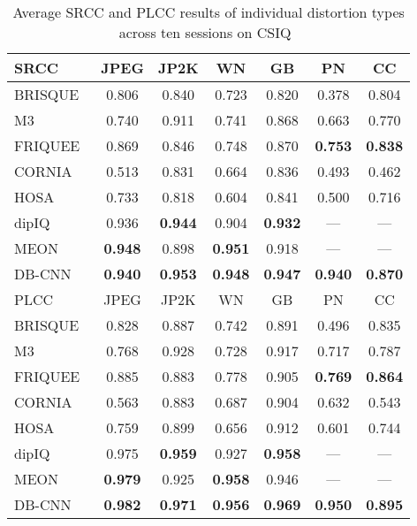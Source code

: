 \documentclass[journal]{IEEEtran}
\begin{document}
\begin{table}[t]
  \centering
  \caption{Average SRCC and PLCC results of individual distortion types across ten sessions on CSIQ~\cite{larson2010most}}\label{tab:csiq_idd}
  \begin{tabular}{l|cccccc}
      \toprule
SRCC & JPEG & JP2K & WN & GB & PN & CC \\
     \hline

      BRISQUE~\cite{mittal2012no} & 0.806 & 0.840 & 0.723 & 0.820 & 0.378 & 0.804 \\
      M3~\cite{xue2014blind}& 0.740 & 0.911 & 0.741 & 0.868 & 0.663 & 0.770 \\
FRIQUEE~\cite{ghadiyaram2017perceptual} & 0.869 & 0.846 & 0.748 & 0.870 & {\bf 0.753} & {\bf 0.838} \\
      CORNIA~\cite{ye2012unsupervised} & 0.513 & 0.831 & 0.664 & 0.836 & 0.493 & 0.462 \\
      HOSA~\cite{xu2016blind} & 0.733 & 0.818 & 0.604 & 0.841 & 0.500 & 0.716 \\
            dipIQ~\cite{ma2017dipiq} & 0.936 & {\bf 0.944} & 0.904 & {\bf 0.932} & --- & --- \\
            MEON~\cite{Ma2018End} & {\bf 0.948} & 0.898 & {\bf 0.951} & 0.918 & --- & --- \\
     \hline
        DB-CNN& {\bf 0.940} & {\bf 0.953} & {\bf 0.948} & {\bf 0.947} & {\bf 0.940} & {\bf 0.870} \\
\midrule
PLCC & JPEG & JP2K & WN & GB & PN & CC \\
     \hline

      BRISQUE~\cite{mittal2012no} & 0.828 & 0.887 & 0.742 & 0.891 & 0.496 & 0.835 \\
      M3~\cite{xue2014blind}& 0.768 & 0.928 & 0.728 & 0.917 & 0.717 & 0.787 \\
FRIQUEE~\cite{ghadiyaram2017perceptual} & 0.885 & 0.883 & 0.778 & 0.905 & {\bf 0.769} & {\bf 0.864} \\
      CORNIA~\cite{ye2012unsupervised} & 0.563 & 0.883 & 0.687 & 0.904 & 0.632 & 0.543 \\
      HOSA~\cite{xu2016blind} & 0.759 & 0.899 & 0.656 & 0.912 & 0.601 & 0.744 \\
            dipIQ~\cite{ma2017dipiq} & 0.975 & {\bf 0.959} & 0.927 & {\bf 0.958} & --- & --- \\
            MEON~\cite{Ma2018End} & {\bf 0.979} & 0.925 & {\bf 0.958} & 0.946 & --- & --- \\
     \hline
        DB-CNN& {\bf 0.982} & {\bf 0.971} & {\bf 0.956} & {\bf 0.969} & {\bf 0.950} & {\bf 0.895} \\
     \bottomrule
   \end{tabular}
\end{table}
\end{document}
